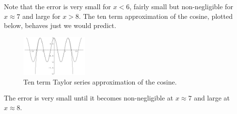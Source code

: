 \begin{Example}
  Note that the error is very small for $x < 6$, fairly small but non-negligible
  for $x \approx 7$ and large for $x > 8$.  The ten term approximation of
  the cosine, plotted below, behaves just we would predict.

  \begin{figure}[h!]
    \begin{center}
      \includegraphics[width=0.3\textwidth]{calculus/differential/taycos10}
    \end{center}
    \caption{Ten term Taylor series approximation of the cosine.}
    \label{taycos10}
  \end{figure}

  The error is very small until it becomes non-negligible at $x \approx 7$
  and large at $x \approx 8$.
\end{Example}





